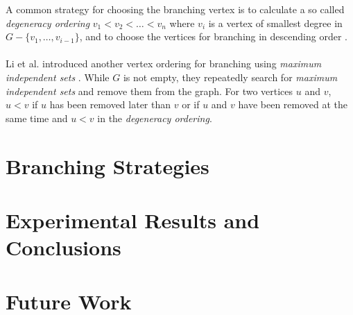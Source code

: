 \documentclass[]{article}
\begin{document}
A common strategy for choosing the branching vertex is to calculate a so called \textit{degeneracy ordering} $v_1 < v_2 < \dots < v_n$ where $v_i$ is a vertex of smallest degree in $G - \{v_1, \dots, v_{i-1} \}$, and to choose the vertices for branching in descending order \cite{cg}.\\\\
Li et al. introduced another vertex ordering for branching using \textit{maximum independent sets} \cite{li_fang_xu}. While $G$ is not empty, they repeatedly search for \textit{maximum independent sets} and remove them from the graph. For two vertices $u$ and $v$, $u < v$ if $u$ has been removed later than $v$ or if $u$ and $v$ have been removed at the same time and $u < v$ in the \textit{degeneracy ordering}. 

\newpage
\section{Branching Strategies} \label{sec4}
\section{Experimental Results and Conclusions} \label{sec5}
\section{Future Work} \label{sec6}
\newpage
\end{document}

